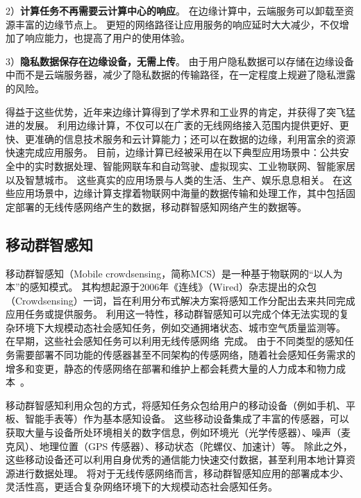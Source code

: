 2）\textbf{计算任务不再需要云计算中心的响应}。
在边缘计算中，云端服务可以卸载至资源丰富的边缘节点上。
更短的网络路径让应用服务的响应延时大大减少，不仅增加了响应能力，也提高了用户的使用体验。

3）\textbf{隐私数据保存在边缘设备，无需上传}。
由于用户隐私数据可以存储在边缘设备中而不是云端服务器，减少了隐私数据的传输路径，在一定程度上规避了隐私泄露的风险。

得益于这些优势，近年来边缘计算得到了学术界和工业界的肯定，并获得了突飞猛进的发展。
利用边缘计算，不仅可以在广袤的无线网络接入范围内提供更好、更快、更准确的信息技术服务和云计算能力；还可以在数据的边缘，利用富余的资源快速完成应用服务。
目前，边缘计算已经被采用在以下典型应用场景中：公共安全中的实时数据处理、智能网联车和自动驾驶、虚拟现实、工业物联网、智能家居以及智慧城市。
这些真实的应用场景与人类的生活、生产、娱乐息息相关。
在这些应用场景中，边缘计算支撑着物联网中海量的数据传输和处理工作，其中包括固定部署的无线传感网络产生的数据，移动群智感知网络产生的数据等。




\subsection{移动群智感知}


移动群智感知（Mobile crowdsensing，简称MCS）是一种基于物联网的“以人为本”的感知模式。
其构想起源于2006年《连线》（Wired）杂志提出的众包（Crowdsensing）一词，旨在利用分布式解决方案将感知工作分配出去来共同完成应用任务或提供服务。
利用这一特性，移动群智感知可以完成个体无法实现的复杂环境下大规模动态社会感知任务，例如交通拥堵状态、城市空气质量监测等。
在早期，这些社会感知任务可以利用无线传感网络~\cite{DBLP:journals/cn/AkyildizSSC02}完成。
由于不同类型的感知任务需要部署不同功能的传感器甚至不同架构的传感网络，随着社会感知任务需求的增多和变更，静态的传感网络在部署和维护上都会耗费大量的人力成本和物力成本~\cite{CNKI/2006/WSNRen}。

移动群智感知利用众包的方式，将感知任务众包给用户的移动设备（例如手机、平板、智能手表等）作为基本感知设备。
这些移动设备集成了丰富的传感器，可以获取大量与设备所处环境相关的数字信息，例如环境光（光学传感器）、噪声（麦克风）、地理位置（GPS 传感器）、移动状态（陀螺仪、加速计）等。
除此之外，这些移动设备还可以利用自身优秀的通信能力快速交付数据，甚至利用本地计算资源进行数据处理。
将对于无线传感网络而言，移动群智感知应用的部署成本少、灵活性高，更适合复杂网络环境下的大规模动态社会感知任务。

